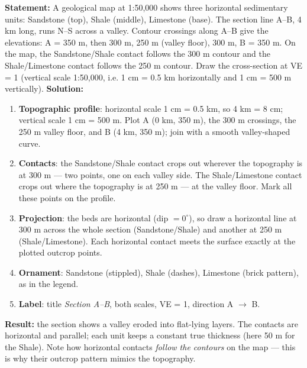\documentclass[11pt]{article}
\newcommand{\cle}[1]{{\popxbold\color{popdark}#1}}
\begin{document}
\begin{exoresolu}
\textbf{Statement:} A geological map at 1:50,000 shows three horizontal sedimentary units: \cle{Sandstone} (top), \cle{Shale} (middle), \cle{Limestone} (base). The section line A--B, 4 km long, runs N--S across a valley. Contour crossings along A--B give the elevations: A = 350 m, then 300 m, 250 m (valley floor), 300 m, B = 350 m. On the map, the Sandstone/Shale contact follows the 300 m contour and the Shale/Limestone contact follows the 250 m contour. Draw the cross-section at VE = 1 (vertical scale 1:50,000, i.e. 1 cm = 0.5 km horizontally and 1 cm = 500 m vertically).
\tcblower
\textbf{Solution:}
\begin{enumerate}
  \item \textbf{Topographic profile}: horizontal scale 1 cm = 0.5 km, so 4 km = 8 cm; vertical scale 1 cm = 500 m. Plot A (0 km, 350 m), the 300 m crossings, the 250 m valley floor, and B (4 km, 350 m); join with a smooth valley-shaped curve.
  \item \textbf{Contacts}: the Sandstone/Shale contact crops out wherever the topography is at 300 m — two points, one on each valley side. The Shale/Limestone contact crops out where the topography is at 250 m — at the valley floor. Mark all these points on the profile.
  \item \textbf{Projection}: the beds are horizontal (dip $= 0^{\circ}$), so draw a horizontal line at 300 m across the whole section (Sandstone/Shale) and another at 250 m (Shale/Limestone). Each horizontal contact meets the surface exactly at the plotted outcrop points.
  \item \textbf{Ornament}: Sandstone (stippled), Shale (dashes), Limestone (brick pattern), as in the legend.
  \item \textbf{Label}: title \emph{Section A--B}, both scales, VE = 1, direction A $\rightarrow$ B.
\end{enumerate}
\textbf{Result:} the section shows a valley eroded into flat-lying layers. The contacts are horizontal and parallel; each unit keeps a constant true thickness (here 50 m for the Shale). Note how horizontal contacts \emph{follow the contours} on the map — this is why their outcrop pattern mimics the topography.
\end{exoresolu}
\end{document}
